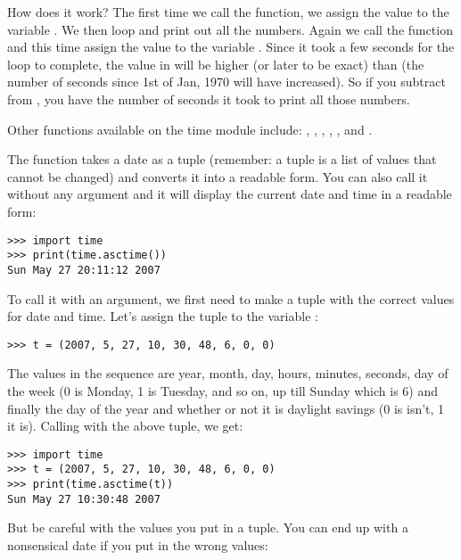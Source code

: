 \noindent
How does it work?  The first time we call the  function, we assign the value to the variable . We then loop and print out all the numbers. Again we call the  function and this time assign the value to the variable . Since it took a few seconds for the loop to complete, the value in  will be higher (or later to be exact) than  (the number of seconds since 1st of Jan, 1970 will have increased). So if you subtract  from , you have the number of seconds it took to print all those numbers.

Other functions available on the time module include: , , , , , and .

The function  takes a date as a tuple (remember: a tuple is a list of values that cannot be changed) and converts it into a readable form. You can also call it without any argument and it will display the current date and time in a readable form:

\begin{Verbatim}[frame=single]
>>> import time
>>> print(time.asctime())
Sun May 27 20:11:12 2007
\end{Verbatim}

\noindent
To call it with an argument, we first need to make a tuple with the correct values for date and time.  Let's assign the tuple to the variable :

\begin{Verbatim}[frame=single]
>>> t = (2007, 5, 27, 10, 30, 48, 6, 0, 0)
\end{Verbatim}

\noindent
The values in the sequence are year, month, day, hours, minutes, seconds, day of the week (0 is Monday, 1 is Tuesday, and so on, up till Sunday which is 6) and finally the day of the year and whether or not it is daylight savings (0 is isn't, 1 it is). Calling  with the above tuple, we get:

\begin{Verbatim}[frame=single]
>>> import time
>>> t = (2007, 5, 27, 10, 30, 48, 6, 0, 0)
>>> print(time.asctime(t))
Sun May 27 10:30:48 2007
\end{Verbatim}

\noindent
But be careful with the values you put in a tuple. You can end up with a nonsensical date if you put in the wrong values:

